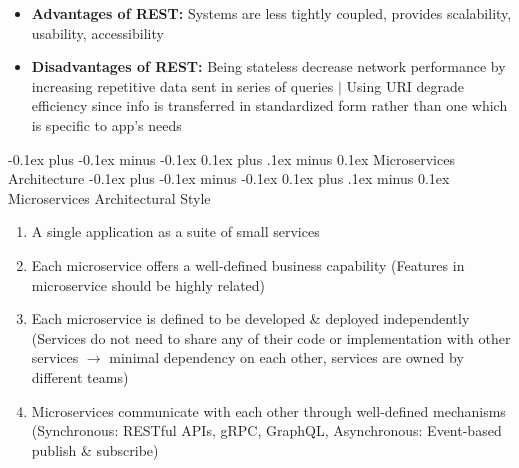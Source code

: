 \documentclass[landscape]{article}
\makeatletter
\renewcommand{\section}{\@startsection{section}{1}{0mm}%
  {-0.1ex plus -0.1ex minus -0.1ex}%
  {0.1ex plus .1ex minus 0.1ex}%
{\normalfont\small\bfseries}}
\renewcommand{\subsection}{\@startsection{subsection}{2}{0mm}%
  {-0.1ex plus -0.1ex minus -0.1ex}%
  {0.1ex plus .1ex minus 0.1ex}%
{\normalfont\scriptsize\bfseries}}
\makeatother
\begin{document}
\begin{multicols*}{5}
\begin{itemize}
\begin{enumerate}
      \end{enumerate}
      \item \textbf{Advantages of REST:} Systems are less tightly coupled, provides scalability, usability, accessibility
      \item \textbf{Disadvantages of REST:} Being stateless decrease network performance by increasing repetitive data sent in series of queries $|$  Using URI degrade efficiency since info is transferred in standardized form rather than one which is specific to app's needs
    \end{itemize}

    \section{Microservices Architecture}
    \subsection{Microservices Architectural Style}
    \begin{enumerate}
      \item A single application as a suite of small services
      \item Each microservice offers a well-defined business capability (Features in microservice should be highly related)
      \item Each microservice is defined to be developed \& deployed independently (Services do not need to share any of their code or implementation with other services $\rightarrow$ minimal dependency on each other, services are owned by different teams)
      \item Microservices communicate with each other through well-defined mechanisms (Synchronous: RESTful APIs, gRPC, GraphQL, Asynchronous: Event-based publish \& subscribe)
    \end{enumerate}
    

\end{multicols*}
\end{document}
